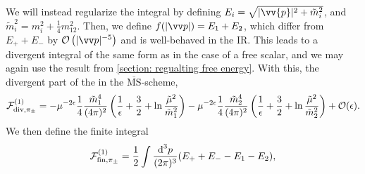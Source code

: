 We will instead regularize the integral by defining $E_i = \sqrt{|\vv{p}|^2 + \tilde m_i^2}$, and $\tilde m_i^2 = m_i^2 + \frac{1}{4} m_{12}^2$.
Then, we define $f(|\vv p|) = E_1 + E_2$, which differ from $E_+ + E_-$ by $\Oh\left(|\vv p|^{-5}\right)$ and is well-behaved in the IR.
This leads to a divergent integral of the same form as in the case of a free scalar, and we may again use the result from \autoref{section: regualting free energy}.
With this, the divergent part of the  in the $\mathrm{\overline{MS}}$-scheme, 
%
\begin{equation}
    \mathcal{F}^{(1)}_{\mathrm{div}, \pi_\pm }
    =
    - \mu^{-2 \epsilon} \frac{1}{4} \frac{\tilde m_1^4}{(4\pi)^2} 
    \left(
        \frac{1}{\epsilon} + \frac{3}{2} + \ln \frac{\tilde \mu^2}{\tilde m_1^2}
    \right) 
    -  \mu^{-2 \epsilon} \frac{1}{4} \frac{\tilde m_2^4}{(4\pi)^2} 
    \left(
        \frac{1}{\epsilon} + \frac{3}{2} + \ln \frac{\tilde \mu^2}{\tilde m_2^2}
    \right) 
    + \mathcal{O}(\epsilon).
\end{equation}
%
We then define the finite integral
%
\begin{equation}
    \mathcal{F}^{(1)}_{\mathrm{fin}, \pi_\pm}
    = 
    \frac{1}{2} \int \frac{\text{d}^3 p}{(2\pi)^3} (E_+ + E_- - E_1 - E_2),
\end{equation}

